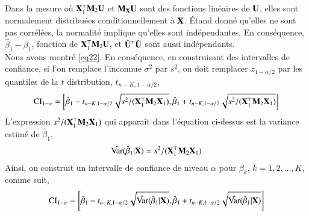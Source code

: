 \documentclass[10pt, reqno]{amsart}
\begin{document}
Dans la mesure où $\mathbf X_1^\top\mathbf M_2\mathbf U$ et $\mathbf M_\mathbf X\mathbf U$ sont des fonctions linéaires de $\mathbf U$, elles sont normalement distribuées conditionnellement à $\mathbf X$. \'Etand donné qu'elles ne sont pas corrélées, la normalité implique qu'elles sont indépendantes. En conséquence, $\hat{\beta}_1 - \beta_1$, fonction de  $\mathbf X_1^\top\mathbf M_2\mathbf U$, et $\hat{\mathbf U}^\top\hat{\mathbf U}$ sont aussi indépendants.\\
Nous avons montré \eqref{eq22}. En conséquence, en construisant des intervalles de confiance, si l'on remplace l'inconnue $\sigma^2$ par $s^2$, on doit remplacer $z_{1-\alpha/2}$ par les quantiles de la $t$ distribution, $t_{n-K, 1-\alpha/2}$,
\begin{align*}
\mathrm{CI}_{1-\alpha} = \left[\hat{\beta}_1 - t_{n-K, 1-\alpha/2}\sqrt{s^2/(\mathbf X_1^\top\mathbf M_2\mathbf X_1)}, 
\hat{\beta}_1 + t_{n-K, 1-\alpha/2}\sqrt{s^2/(\mathbf X_1^\top\mathbf M_2\mathbf X_1)}\right]
\end{align*}
L'expression $s^2/(\mathbf X_1^\top\mathbf M_2\mathbf X_1)$ qui apparaît dans l'équation ci-dessus est la variance estimé de $\hat{\beta}_1$,
\begin{align*}
\hat{\operatorname{Var}}(\hat{\beta} _1| \mathbf X) = s^2/(\mathbf X_1^\top\mathbf M_2\mathbf X_1)
\end{align*}
Ainsi, on construit un intervalle de confiance de niveau $\alpha$ pour $\beta_k$, $k=1, 2,...,K$, comme suit,
\begin{align}
\mathrm{CI}_{1-\alpha} = \left[\hat{\beta}_1 - t_{n-K, 1-\alpha/2}\sqrt{\hat{\operatorname{Var}}(\hat{\beta} _1| \mathbf X)}, 
\hat{\beta}_1 + t_{n-K, 1-\alpha/2}\sqrt{\hat{\operatorname{Var}}(\hat{\beta} _1| \mathbf X)}\right]
\label{eq27}
\end{align}
\end{document}

